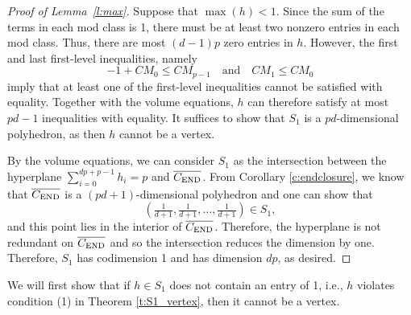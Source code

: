 \documentclass[12pt]{amsart}
\theoremstyle{definition}
\numberwithin{equation}{section}
\renewcommand\>{\rangle}
\newcommand\<{\langle}
\newcommand\0{\mathbf{0}}
\newcommand{\CEND}{C_\textnormal{END}}
\begin{document}
\begin{proof}[Proof of Lemma~\ref{l:max}]
	Suppose that $\max(h) < 1$. 
	Since the sum of the terms in each mod class is 1, there must be at least two nonzero entries in each mod class. 
	Thus, there are most $(d-1)p$ zero entries in $h$. However, the first and last first-level inequalities, namely
	\[
	-1 + CM_0 \leq CM_{p-1} \quad \text{and} \quad CM_{1} \leq CM_0
	\]
	imply that at least one of the first-level inequalities cannot be satisfied with equality. 
	Together with the volume equations, $h$ can therefore satisfy at most $pd - 1$ inequalities with equality.
	It suffices to show that $S_1$ is a $pd$-dimensional polyhedron, as then $h$ cannot be a vertex.	
	
	By the volume equations, we can consider $S_1$ as the intersection between the hyperplane $\sum_{i=0}^{dp+p-1} h_i = p$ and $\overline{\CEND}$. From Corollary \ref{c:endclosure}, we know that $\overline{\CEND}$ is a $(pd+1)$-dimensional polyhedron and one can show that
	\[\left(\tfrac{1}{d+1}, \tfrac{1}{d+1}, \dots, \tfrac{1}{d+1} \right) \in S_1,\]
	and this point lies in the interior of $\overline{\CEND}$. Therefore, the hyperplane is not redundant on $\overline{\CEND}$ and so the intersection reduces the dimension by one.
	Therefore, $S_1$ has codimension 1 and has dimension $dp$, as desired.
\end{proof}

We will first show that if $h \in S_1$ does not contain an entry of 1, i.e., $h$ violates condition (1) in Theorem \ref{t:S1_vertex}, then it cannot be a vertex. 
\end{document}
